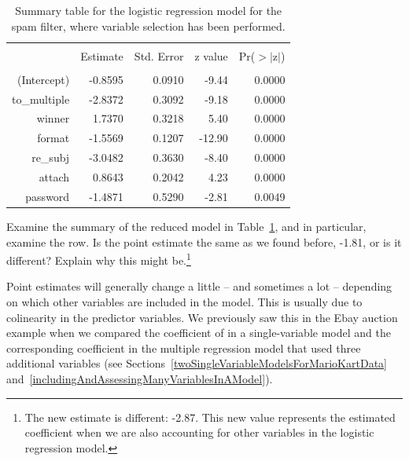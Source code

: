 \begin{table}[ht]
\centering
\begin{tabular}{rrrrr}
  \hline
  \vspace{-3.7mm} & & & & \\
 & Estimate & Std. Error & z value & Pr($>$$|$z$|$) \\ 
  \hline
  \vspace{-3.8mm} & & & & \\
(Intercept) & -0.8595 & 0.0910 & -9.44 & 0.0000 \\ 
  to\_\hspace{0.3mm}multiple & -2.8372 & 0.3092 & -9.18 & 0.0000 \\ 
  winner & 1.7370 & 0.3218 & 5.40 & 0.0000 \\ 
  format & -1.5569 & 0.1207 & -12.90 & 0.0000 \\ 
  re\_\hspace{0.3mm}subj & -3.0482 & 0.3630 & -8.40 & 0.0000 \\ 
  attach & 0.8643 & 0.2042 & 4.23 & 0.0000 \\ 
  password & -1.4871 & 0.5290 & -2.81 & 0.0049 \\ 
\hline
\end{tabular}
\caption{Summary table for the logistic regression model for the spam filter, where variable selection has been performed.}
\label{emailLogisticReducedModel}
\end{table}

\textC{\pagebreak}

\begin{exercise}
Examine the summary of the reduced model in Table~\ref{emailLogisticReducedModel}, and in particular, examine the  row. Is the point estimate the same as we found before, -1.81, or is it different? Explain why this might be.\footnote{The new estimate is different: -2.87. This new value represents the estimated coefficient when we are also accounting for other variables in the logistic regression model.}
\end{exercise}

Point estimates will generally change a little -- and sometimes a lot -- depending on which other variables are included in the model. This is usually due to colinearity in the predictor variables. We previously saw this in the Ebay auction example when we compared the coefficient of  in a single-variable model and the corresponding coefficient in the multiple regression model that used three additional variables (see Sections~\ref{twoSingleVariableModelsForMarioKartData} and~\ref{includingAndAssessingManyVariablesInAModel}).

